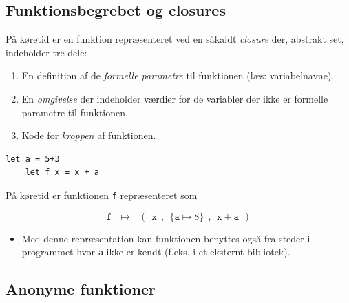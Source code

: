 \documentclass[rgb]{beamer}
\begin{document}
\subsection{Funktionsbegrebet og closures}

\begin{frame}[fragile]
\begin{footnotesize}

  \vspace{1ex}


  På køretid er en funktion repræsenteret ved en såkaldt
  \emph{closure} der, abstrakt set, indeholder tre dele:
  \begin{enumerate}
  \item En definition af de \emph{formelle parametre} til funktionen (læs: variabelnavne).
  \item En \emph{omgivelse} der indeholder værdier for de variabler
    der ikke er formelle parametre til funktionen.
  \item Kode for \emph{kroppen} af funktionen.
  \end{enumerate}


  \begin{lstlisting}[numbers=none,frame=none,mathescape]
    let a = 5+3
    let f x = x + a
  \end{lstlisting}

  På køretid er funktionen \lstinline{f} repræsenteret som

 $$\mathtt{f} ~~~\mapsto ~~~ (~~\mathtt{x}~~, ~~\{\mathtt{a} \mapsto 8\}~~, ~~\mathtt{x + a}~~)$$

  \vspace{-2mm}
  \begin{itemize}
  \item Med denne repræsentation kan funktionen benyttes også fra
    steder i programmet hvor \lstinline{a} ikke er kendt (f.eks. i et
    eksternt bibliotek).
    \end{itemize}
\end{footnotesize}
\end{frame}

\subsection{Anonyme funktioner}
\end{document}
